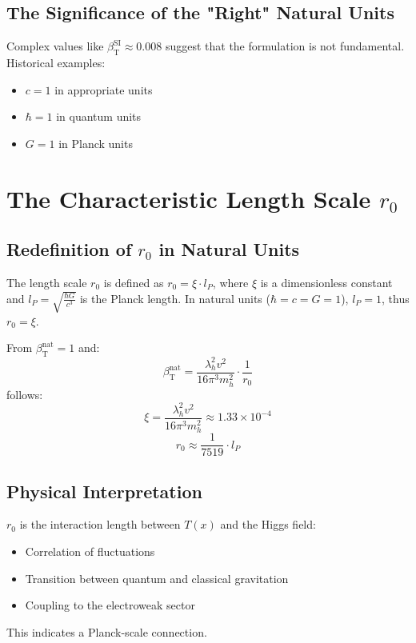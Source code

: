 \documentclass[12pt,a4paper]{article}
\newcommand{\Tfield}{T(x)}
\newcommand{\betaT}{\beta_{\text{T}}}
\begin{document}
	\subsection{The Significance of the "Right" Natural Units}
	
	Complex values like \(\betaT^{\text{SI}} \approx 0.008\) suggest that the formulation is not fundamental. Historical examples:
	\begin{itemize}
		\item \(c = 1\) in appropriate units
		\item \(\hbar = 1\) in quantum units
		\item \(G = 1\) in Planck units
	\end{itemize}
	
	\section{The Characteristic Length Scale \(r_0\)}
	
	\subsection{Redefinition of \(r_0\) in Natural Units}
	
	The length scale \(r_0\) is defined as \(r_0 = \xi \cdot l_P\), where \(\xi\) is a dimensionless constant and \(l_P = \sqrt{\frac{\hbar G}{c^3}}\) is the Planck length. In natural units (\(\hbar = c = G = 1\)), \(l_P = 1\), thus \(r_0 = \xi\).
	
	From \(\betaT^{\text{nat}} = 1\) and:
	\begin{equation}
		\betaT^{\text{nat}} = \frac{\lambda_h^2 v^2}{16\pi^3 m_h^2} \cdot \frac{1}{r_0}
	\end{equation}
	follows:
	\begin{equation}
		\xi = \frac{\lambda_h^2 v^2}{16\pi^3 m_h^2} \approx 1.33 \times 10^{-4}
	\end{equation}
	\begin{equation}
		r_0 \approx \frac{1}{7519} \cdot l_P
	\end{equation}
	
	\subsection{Physical Interpretation}
	
	\(r_0\) is the interaction length between \(\Tfield\) and the Higgs field:
	\begin{itemize}
		\item Correlation of fluctuations
		\item Transition between quantum and classical gravitation
		\item Coupling to the electroweak sector
	\end{itemize}
	This indicates a Planck-scale connection.
	
\end{document}
